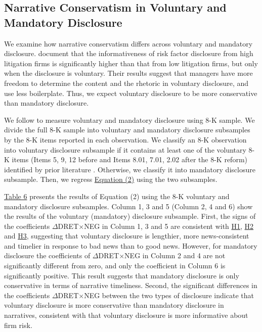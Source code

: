 \documentclass[letterpaper,11pt]{article}
\begin{document}
\begin{spacing}{1.5}
\subsection{Narrative Conservatism in Voluntary and Mandatory Disclosure}
\noindent We examine how narrative conservatism differs across voluntary and mandatory disclosure.  document that the informativeness of risk factor disclosure from high litigation firms is significantly higher than that from low litigation firms, but only when the disclosure is voluntary. Their results suggest that managers have more freedom to determine the content and the rhetoric in voluntary disclosure, and use less boilerplate. Thus, we expect voluntary disclosure to be more conservative than mandatory disclosure.

We follow  to measure voluntary and mandatory disclosure using 8-K sample. We divide the full 8-K sample into voluntary and mandatory disclosure subsamples by the 8-K items reported in each observation. We classify an 8-K observation into voluntary disclosure subsample if it contains at least one of the voluntary 8-K items (Items 5, 9, 12 before and Items 8.01, 7.01, 2.02 after the 8-K reform) identified by prior literature \cite{lermanNewForm8K2010, heMeasuringDisclosureUsing2020}. Otherwise, we classify it into mandatory disclosure subsample. Then, we regress \hyperref[eq2]{Equation (2)} using the two subsamples. 

\hyperref[T6]{Table 6} presents the results of Equation (2) using the 8-K voluntary and mandatory disclosure subsamples. Column 1, 3 and 5 (Column 2, 4 and 6) show the results of the voluntary (mandatory) disclosure subsample. First, the signs of the coefficients $\Delta$DRET$\times$NEG in Column 1, 3 and 5 are consistent with \hyperref[h1]{H1}, \hyperref[h2]{H2} and \hyperref[h3]{H3}, suggesting that voluntary disclosure is lengthier, more news-consistent and timelier in response to bad news than to good news. However, for mandatory disclosure the coefficients of $\Delta$DRET$\times$NEG in Column 2 and 4 are not significantly different from zero, and only the coefficient in Column 6 is significantly positive. This result suggests that mandatory disclosure is only conservative in terms of narrative timeliness. Second, the significant differences in the coefficients $\Delta$DRET$\times$NEG between the two types of disclosure indicate that voluntary disclosure is more conservative than mandatory disclosure in narratives, consistent with  that voluntary disclosure is more informative about firm risk.


\end{spacing}
\end{document}
